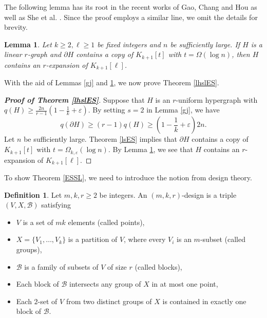 \documentclass[11pt,a4paper]{article}
\theoremstyle{plain}
\newtheorem{lem}[theorem]{Lemma}
\theoremstyle{definition}
\newtheorem{definition}[theorem]{Definition}
\begin{document}
The following lemma has its root in the recent works 
of Gao, Chang and Hou \cite{GCH2022} 
as well as She et al. \cite{SFKH2022}. 
Since the proof employs a similar line, we omit the details for brevity.  

\begin{lem} \label{lem-return}
Let $k\ge 2,\ell\ge 1$ be fixed integers and $n$ be sufficiently large. 
    If $H$ is a linear $r$-graph and $\partial H$ contains a copy of $K_{k+1}[t]$ with $t=\Omega (\log n)$, then $H$ contains an $r$-expansion of $K_{k+1}[\ell]$. 
\end{lem}


With the aid of Lemmas \ref{gj} and \ref{lem-return}, 
we now prove Theorem \ref{lhslES}. 


\begin{proof}[{\bf Proof of Theorem \ref{lhslES}}]
Suppose that $H$ is an $r$-uniform hypergraph with $q(H)\ge \frac{2n}{r-1}(1- \frac{1}{k} + \varepsilon)$. 
 By setting $s=2$ in Lemma \ref{gj}, we have
\[ q(\partial H)\geq (r-1)q(H)\geq 
\left(1-\frac{1}{k}+ \varepsilon \right)2n. \] 
Let $n$ be sufficiently large.  Theorem \ref{lsES} implies that $\partial H$ contains a copy of $K_{k+1}[t]$ with $t=\Omega_{k,\varepsilon}(\log n)$. 
By Lemma \ref{lem-return}, we see that $H$ contains an $r$-expansion of $K_{k+1}[\ell]$. 
\end{proof}


To show Theorem \ref{ESSL}, we need to introduce the notion from design theory. 

\begin{definition} \label{defn-8-3}
Let $m,k,r\geq2$ be integers. An $(m,k,r)$-design is a triple $(V,X,\mathcal{B})$ satisfying 
\begin{itemize}
\item[(a)] $V$ is a set of $mk$ elements (called points),
\item[(b)] $X=\{V_{1},\ldots,V_{k}\}$ is a partition of $V$, where every $V_i$ is an $m$-subset (called groups),
\item[(c)] $\mathcal{B}$ is a family of subsets of $V$ of size $r$ (called blocks),

\item[(d)] 
Each block of $\mathcal{B}$ intersects any group of $X$ in at most one point,

\item[(e)] Each $2$-set of $V$ from two distinct groups of $X$ is contained in exactly one block of $\mathcal{B}$.
\end{itemize}
\end{definition}
\end{document}
